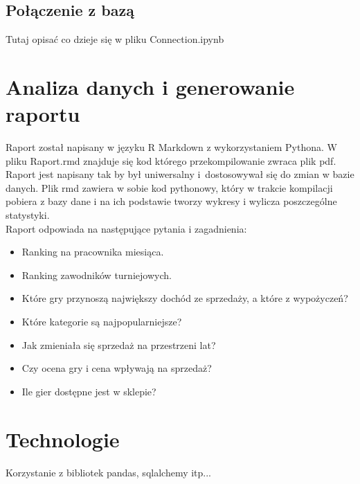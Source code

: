 \documentclass{article}
\begin{document}
	\subsection{Połączenie z bazą}
	Tutaj opisać co dzieje się w pliku Connection.ipynb
	
	
	
	
	\section{Analiza danych i generowanie raportu}
	
	Raport został napisany w języku R Markdown z wykorzystaniem Pythona. W pliku Raport.rmd znajduje się kod którego przekompilowanie zwraca plik pdf. Raport jest napisany tak by był uniwersalny i~dostosowywał się do zmian w bazie danych. Plik rmd zawiera w sobie kod pythonowy, który w trakcie kompilacji pobiera z bazy dane i na ich podstawie tworzy wykresy i wylicza poszczególne statystyki.\\

	\noindent Raport odpowiada na następujące pytania i zagadnienia:
	\begin{itemize}
		\item Ranking na pracownika miesiąca.
		\item Ranking zawodników turniejowych.
		\item Które gry przynoszą największy dochód ze sprzedaży, a które z wypożyczeń?
		\item Które kategorie są najpopularniejsze?
		\item Jak zmieniała się sprzedaż na przestrzeni lat?
		\item Czy ocena gry i cena wpływają na sprzedaż?
		\item Ile gier dostępne jest w sklepie?
	\end{itemize}



	
	\section{Technologie}
	
	Korzystanie z bibliotek pandas, sqlalchemy itp...
	
	
	
\end{document}
